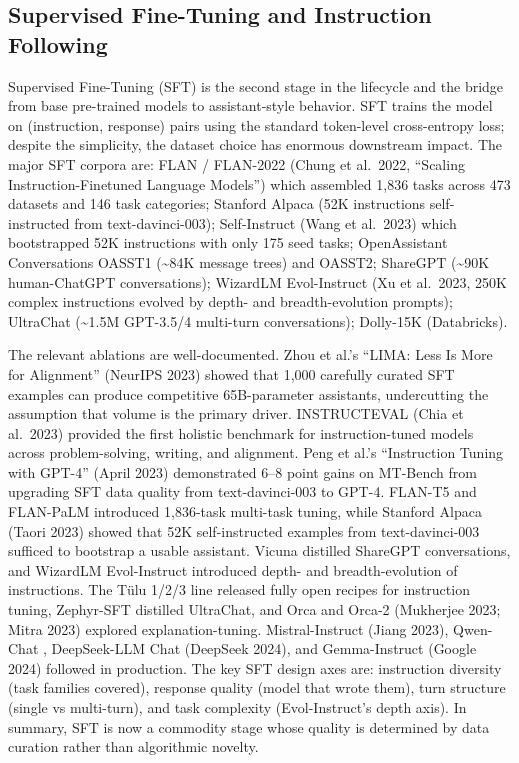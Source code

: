 \documentclass{article}
\begin{document}
\subsection{Supervised Fine-Tuning and Instruction Following}\label{supervised-fine-tuning-and-instruction-following}

Supervised Fine-Tuning (SFT) is the second stage in the lifecycle and the bridge from base pre-trained models to assistant-style behavior. SFT trains the model on (instruction, response) pairs using the standard token-level cross-entropy loss; despite the simplicity, the dataset choice has enormous downstream impact. The major SFT corpora are: FLAN / FLAN-2022 (Chung et al.~2022, ``Scaling Instruction-Finetuned Language Models'') which assembled 1,836 tasks across 473 datasets and 146 task categories; Stanford Alpaca (52K instructions self-instructed from text-davinci-003); Self-Instruct (Wang et al.~2023) which bootstrapped 52K instructions with only 175 seed tasks; OpenAssistant Conversations OASST1 (\textasciitilde84K message trees) and OASST2; ShareGPT (\textasciitilde90K human-ChatGPT conversations); WizardLM Evol-Instruct (Xu et al.~2023, 250K complex instructions evolved by depth- and breadth-evolution prompts); UltraChat (\textasciitilde1.5M GPT-3.5/4 multi-turn conversations); Dolly-15K (Databricks).

The relevant ablations are well-documented. Zhou et al.'s ``LIMA: Less Is More for Alignment'' (NeurIPS 2023) showed that 1,000 carefully curated SFT examples can produce competitive 65B-parameter assistants, undercutting the assumption that volume is the primary driver. INSTRUCTEVAL (Chia et al.~2023) provided the first holistic benchmark for instruction-tuned models across problem-solving, writing, and alignment. Peng et al.'s ``Instruction Tuning with GPT-4'' (April 2023) demonstrated 6--8 point gains on MT-Bench from upgrading SFT data quality from text-davinci-003 to GPT-4. FLAN-T5 and FLAN-PaLM \citep{chung20222022} introduced 1,836-task multi-task tuning, while Stanford Alpaca (Taori 2023) showed that 52K self-instructed examples from text-davinci-003 sufficed to bootstrap a usable assistant. Vicuna \citep{chiang2024chatbotarenaanopen} distilled ShareGPT conversations, and WizardLM Evol-Instruct \citep{xu2023wizardlmempowering} introduced depth- and breadth-evolution of instructions. The Tülu 1/2/3 line \citep{wang2024cdevalabenchmarkfo} released fully open recipes for instruction tuning, Zephyr-SFT \citep{tunstall20232023} distilled UltraChat, and Orca and Orca-2 (Mukherjee 2023; Mitra 2023) explored explanation-tuning. Mistral-Instruct (Jiang 2023), Qwen-Chat \citep{bai20222022}, DeepSeek-LLM Chat (DeepSeek 2024), and Gemma-Instruct (Google 2024) followed in production. The key SFT design axes are: instruction diversity (task families covered), response quality (model that wrote them), turn structure (single vs multi-turn), and task complexity (Evol-Instruct's depth axis). In summary, SFT is now a commodity stage whose quality is determined by data curation rather than algorithmic novelty.
\end{document}
